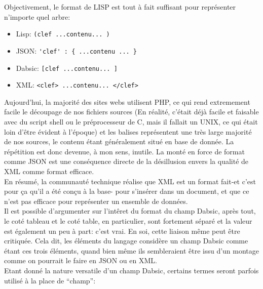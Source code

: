 \documentclass[a5paper, 12pt]{book}
\begin{document}
Objectivement, le format de LISP est tout à fait suffisant pour
représenter n'importe quel arbre:\\
\begin{itemize}
  \item Lisp: \verb!(clef ...contenu... )!
  \item JSON: \verb!'clef' : { ...contenu ... }!
  \item Dabsic: \verb![clef ...contenu... ]!
  \item XML: \verb!<clef> ...contenu... </clef>!
\end{itemize}
\vspace{\baselineskip}

Aujourd'hui, la majorité des sites webs utilisent PHP, ce qui
rend extremement facile le découpage de nos fichiers sources
(En réalité, c'était déjà facile et faisable avec du script
shell ou le préprocesseur de C, mais il fallait un UNIX, ce qui
était loin d'être évident à l'époque) et les balises représentent
une très large majorité de nos sources, le contenu étant
généralement situé en base de donnée. La répétition est donc
devenue, à mon sens, inutile. La monté en force de format
comme JSON est une conséquence directe de la désillusion envers
la qualité de XML comme format efficace.\\

En résumé, la communauté technique réalise que XML
est un format fait-et c'est pour ça qu'il a été conçu à la base-
pour s'insérer dans un document, et que ce n'est
pas efficace pour représenter un ensemble de données.\\

Il est possible d'argumenter sur l'intêret du format du champ
Dabsic, après tout, le coté tableau et le coté table, en
particulier, sont fortement séparé et la valeur est également
un peu à part: c'est vrai. En soi, cette liaison même peut
être critiquée. Cela dit, les éléments du langage considère un
champ Dabsic comme étant ces trois éléments, quand bien
même ils sembleraient être issu d'un montage comme on
pourrait le faire en JSON ou en XML.\\

Etant donné la nature versatile d'un champ Dabsic, certains
termes seront parfois utilisé à la place de ``champ'':
\end{document}

